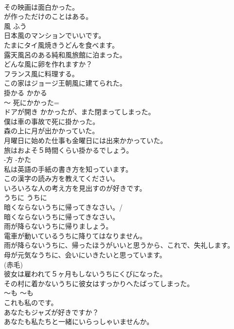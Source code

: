 \documentclass[8pt]{extreport}
\begin{document}
\begin{CJK}{UTF8}{min}
\\	その映画は面白かった。
\\	が作っただけのことはある。  
\\	風	ふう	
\\	日本風のマンションでいいです。  
\\	たまにタイ風焼きうどんを食べます。  
\\	露天風呂のある純和風旅館に泊まった。  
\\	どんな風に卵を作れますか？  
\\	フランス風に料理する。  
\\	この家はジョージ王朝風に建てられた。  
\\	掛かる	かかる	
\\	〜	死にかかった= 
\\	ドアが開き かかったが、また閉まってしまった。  
\\	僕は車の事故で死に掛かった。   
\\	森の上に月が出かかっていた。   
\\	月曜日に始めた仕事も金曜日には出来かかっていた。  
\\	旅はおよそ５時間くらい掛かるでしょう。  
\\	-方	-かた	
\\	私は英語の手紙の書き方を知っています。  
\\	この漢字の読み方を教えてください。  
\\	いろいろな人の考え方を見出すのが好きです。  
\\	うちに	うちに	
\\	暗くならないうちに帰ってきなさい。/ 
\\	暗くならないうちに帰ってきなさい。  
\\	雨が降らないうちに帰りましょう。  
\\	電車が動いているうちに降りてはなりません。  
\\	雨が降らないうちに、帰ったほうがいいと思うから、これで、失礼します。   
\\	母が元気なうちに、会いにいきたいと思っています。  
\\	(赤毛)
\\	彼女は雇われて５ヶ月もしないうちにくびになった。   
\\	その村に着かないうちに彼女はすっかりへたばってしまった。   
\\	〜も	〜も	
\\	これも私のです。
\\	あなたもジャズが好きですか？  
\\	あなたも私たちと一緒にいらっしゃいませんか。  

\end{CJK}
\end{document}
